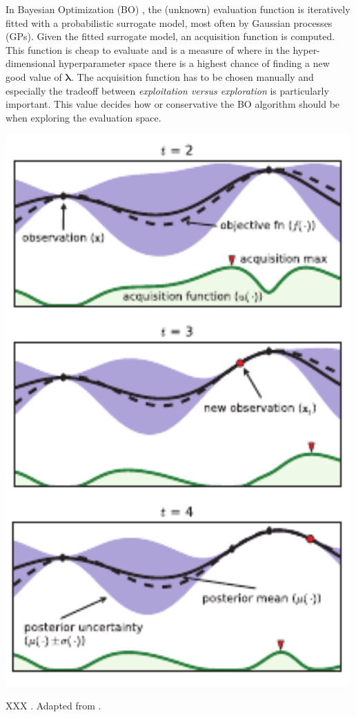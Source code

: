 In Bayesian Optimization (BO) \autocite{brochuTutorialBayesianOptimization2010}, the (unknown) evaluation function is iteratively fitted with a probabilistic surrogate model, most often by Gaussian processes (GPs). Given the fitted surrogate model, an acquisition function is computed. This function is cheap to evaluate and is a measure of where in the hyper-dimensional hyperparameter space there is a highest chance of finding a new good value of $\bm{\lambda}$. The acquisition function has to be chosen manually and especially the tradeoff between \emph{exploitation versus exploration} is particularly important. This value decides how  or conservative the BO algorithm should be when exploring the evaluation space. 

\begin{marginfigure}
  \includegraphics[width=0.99\textwidth]{figures/bayesian_optimization/bo.pdf}
  \caption[Bayesian Optimization]{XXX \TODO. Adapted from \citet{brochuTutorialBayesianOptimization2010}.}
  \label{fig:ml:bayesian_optimization}
\end{marginfigure}

